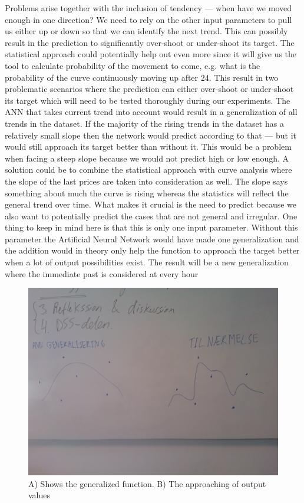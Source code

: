 Problems arise together with the inclusion of tendency --- when have we moved enough in one direction? We need to rely on the other input parameters to pull us either up or down so that we can identify the next trend. This can possibly result in the prediction to significantly over-shoot or under-shoot its target. The statistical approach could potentially help out even more since it will give us the tool to calculate probability of the movement to come, e.g. what is the probability of the curve continuously moving up after 24. This result in two problematic scenarios where the prediction can either over-shoot or under-shoot its target which will need to be tested thoroughly during our experiments. 
The ANN that takes current trend into account would result in a generalization of all trends in the dataset. If the majority of the rising trends in the dataset has a relatively small slope then the network would predict according to that --- but it would still approach its target better than without it. This would be a problem when facing a steep slope because we would not predict high or low enough. A solution could be to combine the statistical approach with curve analysis where the slope of the last prices are taken into consideration as well. The slope says something about much the curve is rising whereas the statistics will reflect the general trend over time. What makes it crucial is the need to predict because we also want to potentially predict the cases that are not general and irregular.
One thing to keep in mind here is that this is only one input parameter. Without this parameter the Artificial Neural Network would have made one generalization and the addition would in theory only help the function to approach the target better when a lot of output possibilities exist. The result will be a new generalization where the immediate past is considered at every hour

\begin{figure}[H]
\centering
\includegraphics[width=0.99\linewidth,natwidth=898,natheight=587]{billeder/WP_000057.jpg}
\caption{A) Shows the generalized function. B) The approaching of output values}
\label{fig:WP}
\end{figure}

